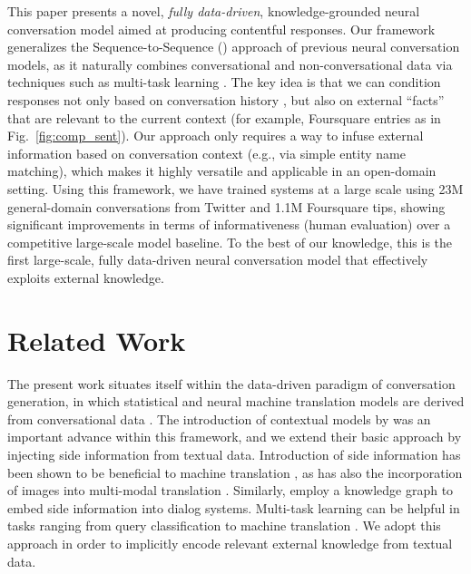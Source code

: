 \documentclass[letterpaper]{article}
\begin{document}
This paper presents a novel, {\it fully data-driven}, knowledge-grounded neural conversation model aimed at producing contentful responses. Our framework generalizes the Sequence-to-Sequence (\sts{}) approach \cite{hochreiter1997long,sutskever2014sequence} of previous neural conversation models, as it naturally combines conversational and non-conversational data via techniques such as multi-task learning \cite{Caruana:1997,liu-EtAl:2015}.
The key idea is that we can condition responses not only based on conversation history \cite{sordoni2015}, but also on external ``facts'' that are relevant to the current context (for example, Foursquare entries as in Fig.~\ref{fig:comp_sent}). 
Our approach only requires a way to infuse external information based on conversation context (e.g., via simple entity name matching), 
which makes it highly versatile and applicable in an open-domain setting.
Using this framework, we have trained systems at a large scale using 23M general-domain conversations from Twitter and 1.1M Foursquare tips, showing significant improvements in terms of informativeness (human evaluation) over a competitive large-scale \sts{} model baseline. To the best of our knowledge, this is the first large-scale, fully data-driven neural conversation model that effectively exploits external knowledge.

\section{Related Work}

The present work situates itself within the data-driven paradigm of conversation generation, in which statistical and neural machine translation models are derived from conversational data  \cite{ritter2011data,sordoni2015,serban2015hierarchical,shang2015neural,vinyals2015neural,li2016diversity}.
The introduction of contextual models by \cite{sordoni2015} was an important advance within this framework, and we extend their basic approach by injecting side information from textual data.  
Introduction of side information has been shown to be beneficial to machine translation \cite{hoang2016incorporating}, as has also the incorporation of images into multi-modal translation \cite{huang2016attention,delbrouck2017visually}. 
Similarly, \cite{HeHeP17-1162} employ a knowledge graph to embed side information into dialog systems. 
Multi-task learning can be helpful in tasks ranging from query classification to machine translation \cite{Caruana:1997,dong2015multi,liu-EtAl:2015,luong2015multi}. 
We adopt this approach in order to implicitly encode relevant external knowledge from textual data.
\end{document}
